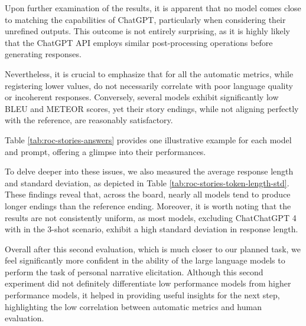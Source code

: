Upon further examination of the results, it is apparent that no model comes close to matching the capabilities of ChatGPT, particularly when considering their unrefined outputs. This outcome is not entirely surprising, as it is highly likely that the ChatGPT API employs similar post-processing operations before generating responses.

Nevertheless, it is crucial to emphasize that for all the automatic metrics, while registering lower values, do not necessarily correlate with poor language quality or incoherent responses. Conversely, several models exhibit significantly low BLEU and METEOR scores, yet their story endings, while not aligning perfectly with the reference, are reasonably satisfactory.

Table \ref{tab:roc-stories-answers} provides one illustrative example for each model and prompt, offering a glimpse into their performances. 

% 
To delve deeper into these issues, we also measured the average response length and standard deviation, as depicted in Table \ref{tab:roc-stories-token-length-std}. These findings reveal that, across the board, nearly all models tend to produce longer endings than the reference ending. Moreover, it is worth noting that the results are not consistently uniform, as most models, excluding ChatChatGPT 4 with in the 3-shot scenario, exhibit a high standard deviation in response length.

Overall after this second evaluation, which is much closer to our planned task, we feel significantly more confident in the ability of the large language models to perform the task of personal narrative elicitation. Although this second experiment did not definitely differentiate low performance models from higher performance models, it helped in providing useful insights for the next step, highlighting the low correlation between automatic metrics and human evaluation.

